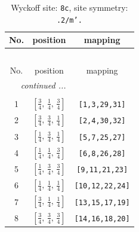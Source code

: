 \documentclass[fleqn,8pt]{jsarticle}
\begin{document}
\begin{longtable}{ccc}
\caption{Wyckoff site: {\tt 8c}, site symmetry: {\tt .2/m'.}}
 \\
 \hline \hline
No. & position & mapping \\ \hline \endfirsthead

\multicolumn{2}{l}{\tablename\ \thetable{}} \\
 \hline \hline
No. & position & mapping \\ \hline \endhead

 \hline \hline
\multicolumn{2}{r}{\footnotesize\it continued ...} \\ \endfoot

 \hline \hline
\multicolumn{2}{r}{} \\ \endlastfoot

1 & $\left[ \frac{3}{4},\, \frac{1}{4},\, \frac{3}{4} \right]$ & {\tt [1,3,29,31]} \\ \hline
2 & $\left[ \frac{3}{4},\, \frac{3}{4},\, \frac{1}{4} \right]$ & {\tt [2,4,30,32]} \\ \hline
3 & $\left[ \frac{1}{4},\, \frac{3}{4},\, \frac{1}{4} \right]$ & {\tt [5,7,25,27]} \\ \hline
4 & $\left[ \frac{1}{4},\, \frac{1}{4},\, \frac{3}{4} \right]$ & {\tt [6,8,26,28]} \\ \hline
5 & $\left[ \frac{1}{4},\, \frac{3}{4},\, \frac{3}{4} \right]$ & {\tt [9,11,21,23]} \\ \hline
6 & $\left[ \frac{1}{4},\, \frac{1}{4},\, \frac{1}{4} \right]$ & {\tt [10,12,22,24]} \\ \hline
7 & $\left[ \frac{3}{4},\, \frac{1}{4},\, \frac{1}{4} \right]$ & {\tt [13,15,17,19]} \\ \hline
8 & $\left[ \frac{3}{4},\, \frac{3}{4},\, \frac{3}{4} \right]$ & {\tt [14,16,18,20]} \\
\end{longtable}
\renewcommand{\arraystretch}{1.2}
\end{document}
